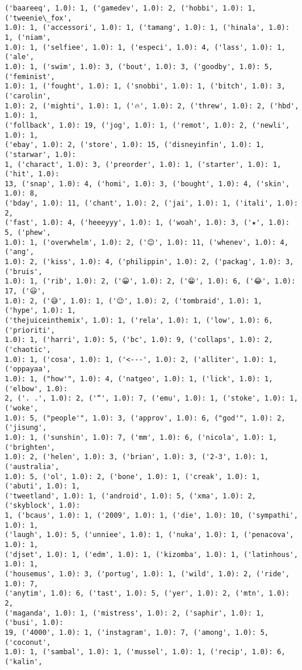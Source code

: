 \documentclass[11pt]{article}
\begin{document}
\begin{Verbatim}[commandchars=\\\{\}]
('baareeq', 1.0): 1, ('gamedev', 1.0): 2, ('hobbi', 1.0): 1, ('tweenie\_fox',
1.0): 1, ('accessori', 1.0): 1, ('tamang', 1.0): 1, ('hinala', 1.0): 1, ('niam',
1.0): 1, ('selfiee', 1.0): 1, ('especi', 1.0): 4, ('lass', 1.0): 1, ('ale',
1.0): 1, ('swim', 1.0): 3, ('bout', 1.0): 3, ('goodby', 1.0): 5, ('feminist',
1.0): 1, ('fought', 1.0): 1, ('snobbi', 1.0): 1, ('bitch', 1.0): 3, ('carolin',
1.0): 2, ('mighti', 1.0): 1, ('🔥', 1.0): 2, ('threw', 1.0): 2, ('hbd', 1.0): 1,
('follback', 1.0): 19, ('jog', 1.0): 1, ('remot', 1.0): 2, ('newli', 1.0): 1,
('ebay', 1.0): 2, ('store', 1.0): 15, ('disneyinfin', 1.0): 1, ('starwar', 1.0):
1, ('charact', 1.0): 3, ('preorder', 1.0): 1, ('starter', 1.0): 1, ('hit', 1.0):
13, ('snap', 1.0): 4, ('homi', 1.0): 3, ('bought', 1.0): 4, ('skin', 1.0): 8,
('bday', 1.0): 11, ('chant', 1.0): 2, ('jai', 1.0): 1, ('itali', 1.0): 2,
('fast', 1.0): 4, ('heeeyyy', 1.0): 1, ('woah', 1.0): 3, ('★', 1.0): 5, ('phew',
1.0): 1, ('overwhelm', 1.0): 2, ('😊', 1.0): 11, ('whenev', 1.0): 4, ('ang',
1.0): 2, ('kiss', 1.0): 4, ('philippin', 1.0): 2, ('packag', 1.0): 3, ('bruis',
1.0): 1, ('rib', 1.0): 2, ('😀', 1.0): 2, ('😁', 1.0): 6, ('😂', 1.0): 17, ('😃',
1.0): 2, ('😅', 1.0): 1, ('😉', 1.0): 2, ('tombraid', 1.0): 1, ('hype', 1.0): 1,
('thejuiceinthemix', 1.0): 1, ('rela', 1.0): 1, ('low', 1.0): 6, ('prioriti',
1.0): 1, ('harri', 1.0): 5, ('bc', 1.0): 9, ('collaps', 1.0): 2, ('chaotic',
1.0): 1, ('cosa', 1.0): 1, ('<---', 1.0): 2, ('alliter', 1.0): 1, ('oppayaa',
1.0): 1, ("how'", 1.0): 4, ('natgeo', 1.0): 1, ('lick', 1.0): 1, ('elbow', 1.0):
2, ('. .', 1.0): 2, ('“', 1.0): 7, ('emu', 1.0): 1, ('stoke', 1.0): 1, ('woke',
1.0): 5, ("people'", 1.0): 3, ('approv', 1.0): 6, ("god'", 1.0): 2, ('jisung',
1.0): 1, ('sunshin', 1.0): 7, ('mm', 1.0): 6, ('nicola', 1.0): 1, ('brighten',
1.0): 2, ('helen', 1.0): 3, ('brian', 1.0): 3, ('2-3', 1.0): 1, ('australia',
1.0): 5, ('ol', 1.0): 2, ('bone', 1.0): 1, ('creak', 1.0): 1, ('abuti', 1.0): 1,
('tweetland', 1.0): 1, ('android', 1.0): 5, ('xma', 1.0): 2, ('skyblock', 1.0):
1, ('bcaus', 1.0): 1, ('2009', 1.0): 1, ('die', 1.0): 10, ('sympathi', 1.0): 1,
('laugh', 1.0): 5, ('unniee', 1.0): 1, ('nuka', 1.0): 1, ('penacova', 1.0): 1,
('djset', 1.0): 1, ('edm', 1.0): 1, ('kizomba', 1.0): 1, ('latinhous', 1.0): 1,
('housemus', 1.0): 3, ('portug', 1.0): 1, ('wild', 1.0): 2, ('ride', 1.0): 7,
('anytim', 1.0): 6, ('tast', 1.0): 5, ('yer', 1.0): 2, ('mtn', 1.0): 2,
('maganda', 1.0): 1, ('mistress', 1.0): 2, ('saphir', 1.0): 1, ('busi', 1.0):
19, ('4000', 1.0): 1, ('instagram', 1.0): 7, ('among', 1.0): 5, ('coconut',
1.0): 1, ('sambal', 1.0): 1, ('mussel', 1.0): 1, ('recip', 1.0): 6, ('kalin',

\end{Verbatim}
\end{document}
